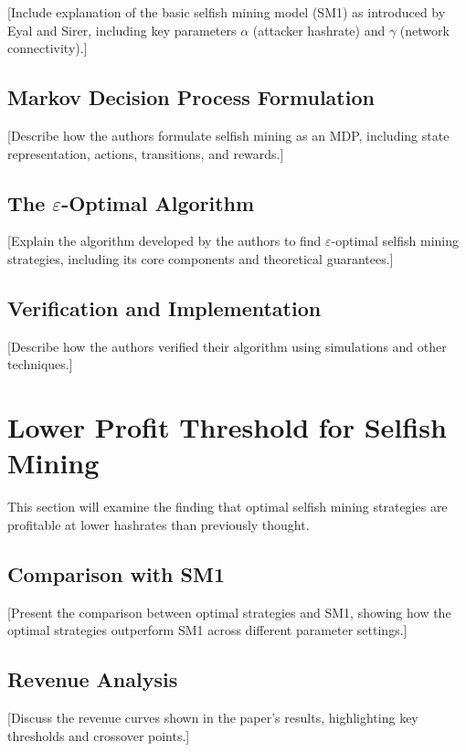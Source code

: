 \documentclass[conference]{IEEEtran}
\begin{document}
[Include explanation of the basic selfish mining model (SM1) as introduced by Eyal and Sirer, including key parameters $\alpha$ (attacker hashrate) and $\gamma$ (network connectivity).]

\subsection{Markov Decision Process Formulation}

[Describe how the authors formulate selfish mining as an MDP, including state representation, actions, transitions, and rewards.]

\subsection{The $\varepsilon$-Optimal Algorithm}

[Explain the algorithm developed by the authors to find $\varepsilon$-optimal selfish mining strategies, including its core components and theoretical guarantees.]

\subsection{Verification and Implementation}

[Describe how the authors verified their algorithm using simulations and other techniques.]

\section{Lower Profit Threshold for Selfish Mining}

This section will examine the finding that optimal selfish mining strategies are profitable at lower hashrates than previously thought.

\subsection{Comparison with SM1}

[Present the comparison between optimal strategies and SM1, showing how the optimal strategies outperform SM1 across different parameter settings.]

\subsection{Revenue Analysis}

[Discuss the revenue curves shown in the paper's results, highlighting key thresholds and crossover points.]
\end{document}
